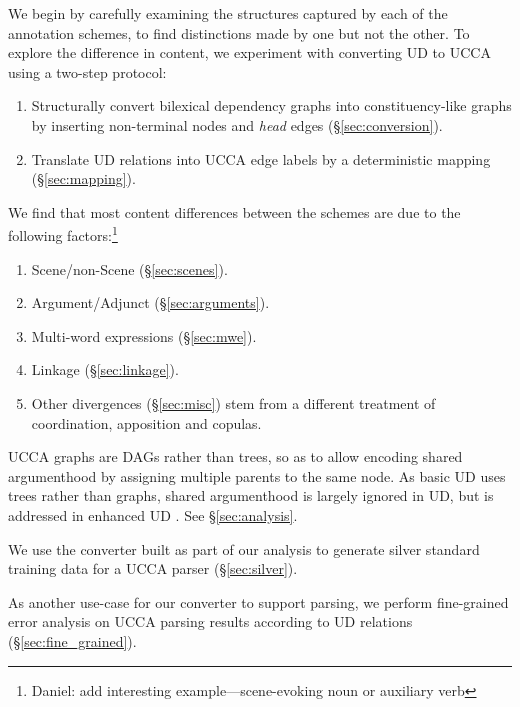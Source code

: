 \documentclass[11pt,a4paper]{article}
\newcommand{\daniel}[1]{\footnote{\color{blue}Daniel: #1}}
\begin{document}
We begin by carefully examining the structures captured by each of the annotation schemes,
to find distinctions made by one but not the other.
To explore the difference in content, we experiment with converting UD to UCCA
using a two-step protocol:
\begin{enumerate}
\item Structurally convert bilexical dependency graphs into constituency-like graphs by inserting
  non-terminal nodes and \textit{head} edges (\S\ref{sec:conversion}).
\item Translate UD relations into UCCA edge labels
  by a deterministic mapping (\S\ref{sec:mapping}).
\end{enumerate}
  
   We find that most content differences between the schemes are due to the following
   factors:\daniel{add interesting example---scene-evoking noun or auxiliary verb}

  \begin{enumerate}[noitemsep]
    \item Scene/non-Scene (\S\ref{sec:scenes}).
    \item Argument/Adjunct (\S\ref{sec:arguments}).
    \item Multi-word expressions (\S\ref{sec:mwe}).
    \item Linkage (\S\ref{sec:linkage}).
    \item Other divergences (\S\ref{sec:misc})
    stem from a different treatment of coordination, apposition and copulas.
     \end{enumerate}

   UCCA graphs are DAGs rather than trees, so as to allow encoding shared argumenthood
   by assigning multiple parents to the same node.
   As basic UD uses trees rather than graphs, shared argumenthood is largely ignored in UD,
   but is addressed in enhanced UD \cite{SCHUSTER16.779}.
  See \S\ref{sec:analysis}.

  We use the converter built as part of our analysis to generate silver standard
  training data for a UCCA parser (\S\ref{sec:silver}).
  
  As another use-case for our converter to support parsing,
  we perform fine-grained error analysis on UCCA parsing results
  according to UD relations (\S\ref{sec:fine_grained}).

\end{document}
